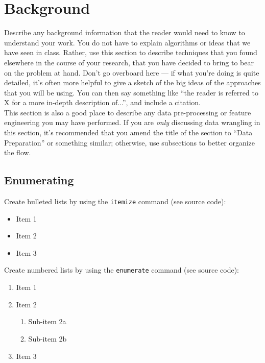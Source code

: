
\section{Background}
\label{sec:background}

Describe any background information that the reader would need to know
to understand your work. You do not have to explain algorithms or
ideas that we have seen in class. Rather, use this section to describe
techniques that you found elsewhere in the course of your research,
that you have decided to bring to bear on the problem at hand. Don't
go overboard here --- if what you're doing is quite detailed, it's
often more helpful to give a sketch of the big ideas of the approaches
that you will be using. You can then say something like ``the reader
is referred to X for a more in-depth description of...'', and include
a citation.\\

This section is also a good place to describe any data pre-processing
or feature engineering you may have performed. If you are \emph{only}
discussing data wrangling in this section, it's recommended that you
amend the title of the section to ``Data Preparation'' or something
similar; otherwise, use subsections to better organize the flow.

\subsection{Enumerating}
\label{subsec:enum}

Create bulleted lists by using the \texttt{itemize} command (see source code):
\begin{itemize}
  \item Item 1
  \item Item 2
  \item Item 3
\end{itemize}
Create numbered lists by using the \texttt{enumerate} command (see source code):
\begin{enumerate}
  \item Item 1
  \item Item 2
    \begin{enumerate}
    \item Sub-item 2a
    \item Sub-item 2b
    \end{enumerate}
  \item Item 3
\end{enumerate}

